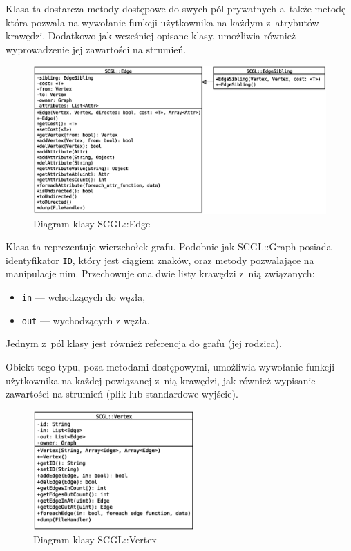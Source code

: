 \documentclass[a4paper,12pt,polish,twoside,openright]{thesis}
\newcommand\code[1]{\lstinline[style=line]{#1}}
\begin{document}
\begin{description}
	Klasa ta dostarcza metody dostępowe do swych pól prywatnych a~także metodę która pozwala na wywołanie funkcji użytkownika na każdym z~atrybutów krawędzi.
	Dodatkowo jak wcześniej opisane klasy, umożliwia również wyprowadzenie jej zawartości na strumień.
	\begin{figure}[htb]
	\begin{center}
		\includegraphics[width=1.00\textwidth]{gfx/class_edge.eps}
		\caption{Diagram klasy SCGL::Edge}
	\end{center}
	\end{figure}

	\item[SCGL::Vertex]
	Klasa ta reprezentuje wierzchołek grafu.
	Podobnie jak SCGL::Graph posiada identyfikator \code{ID}, który jest ciągiem znaków, oraz metody pozwalające na manipulacje nim.
	Przechowuje ona dwie listy krawędzi z~nią związanych:
	\begin{itemize}
		\item \code{in} --- wchodzących do węzła,
		\item \code{out} --- wychodzących z węzła.
	\end{itemize}
	Jednym z~pól klasy jest również referencja do grafu (jej rodzica).

	Obiekt tego typu, poza metodami dostępowymi, umożliwia wywołanie funkcji użytkownika na każdej powiązanej z~nią krawędzi, jak również wypisanie zawartości na strumień (plik lub standardowe wyjście).
	\begin{figure}[htb]
	\begin{center}
		\includegraphics[width=0.55\textwidth]{gfx/class_vertex.eps}
		\caption{Diagram klasy SCGL::Vertex}
	\end{center}
	\end{figure}


\end{description}
\end{document}
